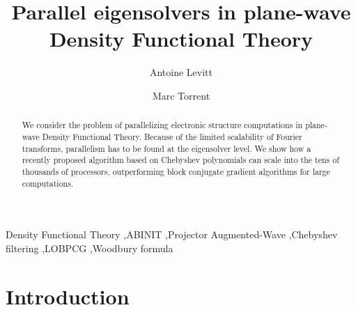 \documentclass[11pt]{elsarticle}
\begin{document}
\begin{frontmatter}
  \begin{keyword}
    Density Functional Theory \sep ABINIT \sep Projector Augmented-Wave \sep Chebyshev filtering \sep LOBPCG
    \sep Woodbury formula
  \end{keyword}

  \begin{abstract}
    We consider the problem of parallelizing electronic structure
    computations in plane-wave Density Functional Theory. Because of
    the limited scalability of Fourier transforms, parallelism has to
    be found at the eigensolver level. We show how a recently proposed
    algorithm based on Chebyshev polynomials can scale into the tens
    of thousands of processors, outperforming block conjugate gradient
    algorithms for large computations.
  \end{abstract}
  \title{Parallel eigensolvers in plane-wave Density Functional Theory}
  \author{Antoine Levitt}

  \author{Marc Torrent}

  \address{CEA, DAM, DIF, F-91297, Arpajon, France}
\end{frontmatter}
\tableofcontents

\section{Introduction}
\end{document}
